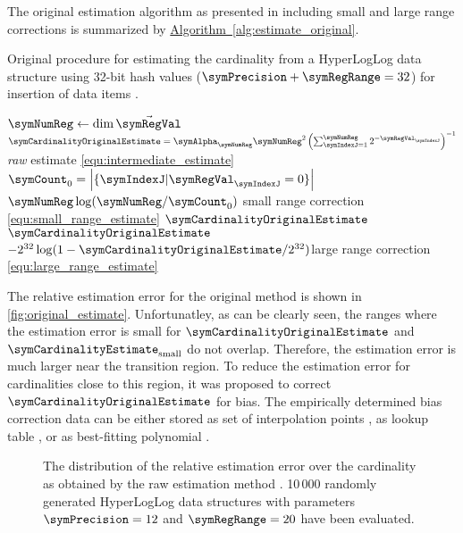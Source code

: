 \documentclass[a4paper]{scrartcl}
\newcommand*{\algoref}[1]{\hyperref[#1]{Algorithm~\ref*{#1}}}
\begin{document}
The original estimation algorithm as presented in \cite{Flajolet2007} including small and large range corrections is summarized by \algoref{alg:estimate_original}. 
\begin{algorithm}
\caption{Original procedure for estimating the cardinality from a  HyperLogLog data structure using 32-bit hash values ($\symPrecision+\symRegRange = 32$) for insertion of data items \cite{Flajolet2007}.}
\label{alg:estimate_original}
\begin{algorithmic}
\State $\symNumReg \gets \dim \vec{\symRegVal}$
\State $\symCardinalityOriginalEstimate = \symAlpha_\symNumReg \symNumReg^2\left(\sum_{\symIndexJ=1}^\symNumReg 2^{-\symRegVal_\symIndexJ}\right)^{-1}$
\Comment \emph{raw} estimate \eqref{equ:intermediate_estimate}
\State $\symCount_0 = \left|\{\symIndexJ |\symRegVal_\symIndexJ=0\}\right|$
\State \Return $\symNumReg \log(\symNumReg / \symCount_0)$ \Comment small range correction \eqref{equ:small_range_estimate}
\Else
\State \Return $\symCardinalityOriginalEstimate$
\EndIf
{}
\State \Return $\symCardinalityOriginalEstimate$
\Else
\State\Return $-2^{32}\log(1-\symCardinalityOriginalEstimate/2^{32})$\Comment large range correction \eqref{equ:large_range_estimate}
\EndIf
\EndFunction
\end{algorithmic}
\end{algorithm}
The relative estimation error for the original method is shown in \autoref{fig:original_estimate}. Unfortunatley, as can be clearly seen, the ranges where the estimation error is small for $\symCardinalityOriginalEstimate$ and $\symCardinalityEstimate_\text{small}$ do not overlap. Therefore, the estimation error is much larger near the transition region. To reduce the estimation error for cardinalities close to this region, it was proposed to correct $\symCardinalityOriginalEstimate$ for bias. The empirically determined bias correction data can be either stored as set of interpolation points \cite{Heule2013}, as lookup table \cite{Rhodes2015}, or as best-fitting polynomial \cite{Sanfilippo2014}. 

\begin{figure}
\centering

\caption{The distribution of the relative estimation error over the cardinality as obtained by the raw estimation method \cite{Flajolet2007}. 10\,000 randomly generated HyperLogLog data structures with parameters $\symPrecision = 12$ and $\symRegRange=20$ have been evaluated.}
\label{fig:raw_estimate}
\end{figure}
\end{document}
